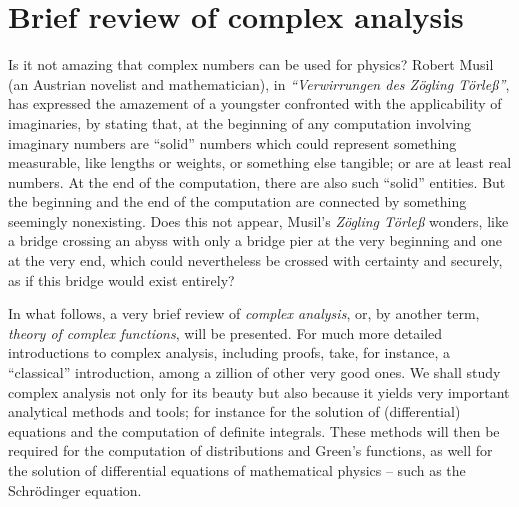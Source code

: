 \chapter{Brief review of complex analysis}
\label{2011-m-ch-ca}

Is it not amazing that complex numbers\cite[-20mm]{Hlawka-zz} can be used for physics?
Robert Musil (an Austrian novelist and  mathematician), in
{\it ``Verwirrungen des Z\"ogling T\"orle\ss''},
has expressed the amazement of a youngster confronted with the applicability of imaginaries,
by stating that, at the beginning of any computation involving imaginary numbers
are ``solid'' numbers which could represent something measurable, like lengths or weights,
or something else tangible; or are at least real numbers.
At the end of the computation, there are also such ``solid'' entities.
But the beginning and the end of the computation are connected by something
seemingly nonexisting.
Does this not appear, Musil's {\it  Z\"ogling T\"orle\ss} wonders,
like a bridge crossing an abyss
with only a bridge pier at the very beginning and one at the very end,
which could nevertheless be crossed with certainty and securely,
as if this bridge would exist entirely?


In what follows, a very brief review of
{\em complex analysis},
or, by another term,
{\em theory of complex functions},
will be presented.
For much more detailed introductions to complex analysis,
including proofs,
take, for instance, a ``classical'' introduction,\cite[-7mm]{Remmert-1991-tocf}%
among a zillion of other very good ones.\cite{freitag-busam-en,whittaker:1927:cma,Greene,Hille62,ahlfors:1966:ca}
We shall study complex analysis not only for its beauty but also because it yields
very important analytical methods and tools;
for instance for the solution of (differential) equations and the
computation of definite integrals.
These methods will then be required for the computation of distributions and Green's functions,
as well for the solution of differential equations of mathematical physics -- such as the Schr\"odinger equation.

